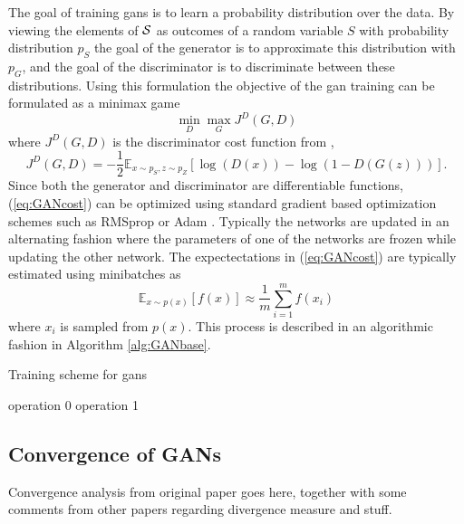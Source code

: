 The goal of training \acrshort{gans} is to learn a probability distribution over the data. By viewing the elements of $\mathcal{S}$ as outcomes of a random variable $S$ with probability distribution $p_S$ the goal of the generator is to approximate this distribution with $p_G$, and the goal of the discriminator is to discriminate between these distributions. Using this formulation the objective of the \acrshort{gan} training can be formulated as a minimax game 
\begin{equation}
    \min_D \max_G J^{D}(G, D)
\end{equation}
where $J^D(G, D)$ is the discriminator cost function from \parencite{goodfellow2016nips},
\begin{equation}
    J^D(G, D) = -\frac{1}{2}\mathbb{E}_{x \sim p_S, z \sim p_Z}\left[\log(D(x)) - \log(1 - D(G(z))) \right].
    \label{eq:GANcost}
\end{equation}
Since both the generator and discriminator are differentiable functions, (\ref{eq:GANcost}) can be optimized using standard gradient based optimization schemes such as RMSprop \parencite{tieleman2012lecture} or Adam \parencite{kingma2014adam}. Typically the networks are updated in an alternating fashion where the parameters of one of the networks are frozen while updating the other network. The expectectations in (\ref{eq:GANcost}) are typically estimated using minibatches as 
\begin{equation}
    \mathbb{E}_{x\sim p(x)}[f(x)] \approx \frac{1}{m}\sum_{i=1}^mf(x_i)
\end{equation}
where $x_i$ is sampled from $p(x)$. This process is described in an algorithmic fashion in Algorithm \ref{alg:GANbase}.

\begin{algorithm}
    \caption{Training scheme for \acrlong{gans}}
  \label{alg:GANbase}
  \begin{algorithmic}[1]
    \STATE operation 0 \label{op0}
    \STATE operation 1 \label{op1}
  \end{algorithmic}
\end{algorithm}

\subsection{Convergence of GANs}
Convergence analysis from original paper goes here, together with some comments from other papers regarding divergence measure and stuff.

